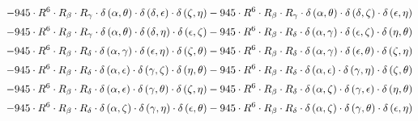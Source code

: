 \begin{subequations}
\begin{gather}
 \\[0.2em] \notag 		 - 945 \cdot R^{6} \cdot R_{\beta{}} \cdot R_{\gamma{}} \cdot \delta{}\left(\alpha{}, \theta{}\right) \cdot \delta{}\left(\delta{}, \epsilon{}\right) \cdot \delta{}\left(\zeta{}, \eta{}\right)- 945 \cdot R^{6} \cdot R_{\beta{}} \cdot R_{\gamma{}} \cdot \delta{}\left(\alpha{}, \theta{}\right) \cdot \delta{}\left(\delta{}, \zeta{}\right) \cdot \delta{}\left(\epsilon{}, \eta{}\right) 
 \\[0.2em] \notag 		 - 945 \cdot R^{6} \cdot R_{\beta{}} \cdot R_{\gamma{}} \cdot \delta{}\left(\alpha{}, \theta{}\right) \cdot \delta{}\left(\delta{}, \eta{}\right) \cdot \delta{}\left(\epsilon{}, \zeta{}\right)- 945 \cdot R^{6} \cdot R_{\beta{}} \cdot R_{\delta{}} \cdot \delta{}\left(\alpha{}, \gamma{}\right) \cdot \delta{}\left(\epsilon{}, \zeta{}\right) \cdot \delta{}\left(\eta{}, \theta{}\right) 
 \\[0.2em] \notag 		 - 945 \cdot R^{6} \cdot R_{\beta{}} \cdot R_{\delta{}} \cdot \delta{}\left(\alpha{}, \gamma{}\right) \cdot \delta{}\left(\epsilon{}, \eta{}\right) \cdot \delta{}\left(\zeta{}, \theta{}\right)- 945 \cdot R^{6} \cdot R_{\beta{}} \cdot R_{\delta{}} \cdot \delta{}\left(\alpha{}, \gamma{}\right) \cdot \delta{}\left(\epsilon{}, \theta{}\right) \cdot \delta{}\left(\zeta{}, \eta{}\right) 
 \\[0.2em] \notag 		 - 945 \cdot R^{6} \cdot R_{\beta{}} \cdot R_{\delta{}} \cdot \delta{}\left(\alpha{}, \epsilon{}\right) \cdot \delta{}\left(\gamma{}, \zeta{}\right) \cdot \delta{}\left(\eta{}, \theta{}\right)- 945 \cdot R^{6} \cdot R_{\beta{}} \cdot R_{\delta{}} \cdot \delta{}\left(\alpha{}, \epsilon{}\right) \cdot \delta{}\left(\gamma{}, \eta{}\right) \cdot \delta{}\left(\zeta{}, \theta{}\right) 
 \\[0.2em] \notag 		 - 945 \cdot R^{6} \cdot R_{\beta{}} \cdot R_{\delta{}} \cdot \delta{}\left(\alpha{}, \epsilon{}\right) \cdot \delta{}\left(\gamma{}, \theta{}\right) \cdot \delta{}\left(\zeta{}, \eta{}\right)- 945 \cdot R^{6} \cdot R_{\beta{}} \cdot R_{\delta{}} \cdot \delta{}\left(\alpha{}, \zeta{}\right) \cdot \delta{}\left(\gamma{}, \epsilon{}\right) \cdot \delta{}\left(\eta{}, \theta{}\right) 
 \\[0.2em] \notag 		 - 945 \cdot R^{6} \cdot R_{\beta{}} \cdot R_{\delta{}} \cdot \delta{}\left(\alpha{}, \zeta{}\right) \cdot \delta{}\left(\gamma{}, \eta{}\right) \cdot \delta{}\left(\epsilon{}, \theta{}\right)- 945 \cdot R^{6} \cdot R_{\beta{}} \cdot R_{\delta{}} \cdot \delta{}\left(\alpha{}, \zeta{}\right) \cdot \delta{}\left(\gamma{}, \theta{}\right) \cdot \delta{}\left(\epsilon{}, \eta{}\right) 

\end{gather}
\end{subequations}
